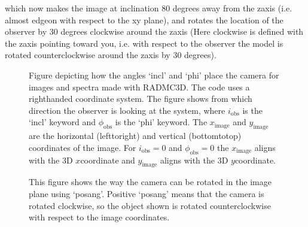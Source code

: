 \documentclass[letterpaper,10pt,english]{sphinxmanual}
\begin{document}
\begin{sphinxVerbatim}[commandchars=\\\{\}]
       
\end{sphinxVerbatim}

which now makes the image at inclination 80 degrees away from the z\sphinxhyphen{}axis
(i.e. almost edge\sphinxhyphen{}on with respect to the x\sphinxhyphen{}y plane), and rotates the
location of the observer by 30 degrees clockwise around the
z\sphinxhyphen{}axis (Here clockwise is defined with the z\sphinxhyphen{}axis pointing toward
you, i.e. with respect to the observer the model is rotated
counter\sphinxhyphen{}clockwise around the z\sphinxhyphen{}axis by 30 degrees).

\begin{figure}[htbp]
\centering
\capstart

\noindent{}
\caption{Figure depicting how the angles ‘incl’ and ‘phi’ place the camera for images
and spectra made with RADMC\sphinxhyphen{}3D. The code uses a right\sphinxhyphen{}handed coordinate
system. The figure shows from which direction the observer is looking at the
system, where \(i_{\mathrm{obs}}\) is the ‘incl’ keyword and
\(\phi_{\mathrm{obs}}\) is the ‘phi’ keyword. The
\(x_{\mathrm{image}}\) and \(y_{\mathrm{image}}\) are the horizontal
(left\sphinxhyphen{}to\sphinxhyphen{}right) and vertical (bottom\sphinxhyphen{}to\sphinxhyphen{}top) coordinates of the image. For
\(i_{\mathrm{obs}}=0\) and \(\phi_{\mathrm{obs}}=0\) the
\(x_{\mathrm{image}}\) aligns with the 3\sphinxhyphen{}D \(x\)\sphinxhyphen{}coordinate and
\(y_{\mathrm{image}}\) aligns with the 3\sphinxhyphen{}D \(y\)\sphinxhyphen{}coordinate.}\label{\detokenize{imagesspectra:id1}}\label{\detokenize{imagesspectra:fig-cameraorient}}\end{figure}

\begin{figure}[htbp]
\centering
\capstart

\noindent{}
\caption{This figure shows the way the camera can be rotated in the image plane using
‘posang’. Positive ‘posang’ means that the camera is rotated clockwise, so
the object shown is rotated counter\sphinxhyphen{}clockwise with respect to the image
coordinates.}\label{\detokenize{imagesspectra:id2}}\label{\detokenize{imagesspectra:fig-posang}}\end{figure}
\end{document}
